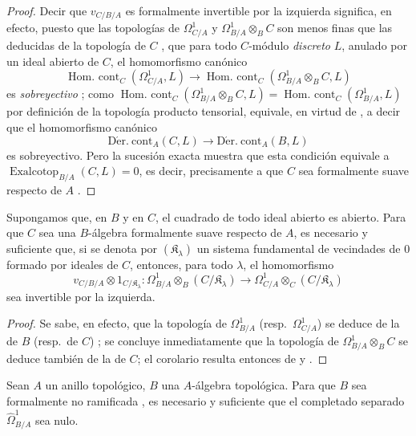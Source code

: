 \begin{proof}
Decir que $v_{C/B/A}$ es formalmente invertible por la izquierda significa, en efecto,
puesto que las topologías de $\Omega^1_{C/A}$ y $\Omega^1_{B/A}\otimes_B C$
son menos finas que las deducidas de la topología de $C$
, que para todo $C$-módulo \emph{discreto} $L$, anulado por un
ideal abierto de $C$, el homomorfismo canónico
\[
  \operatorname{Hom.\ cont}_C(\Omega^1_{C/A},L)\to
  \operatorname{Hom.\ cont}_C(\Omega^1_{B/A}\otimes_B C,L)
\]
es \emph{sobreyectivo} ; como
$\operatorname{Hom.\ cont}_C(\Omega^1_{B/A}\otimes_B C,L)=
\operatorname{Hom.\ cont}_C(\Omega^1_{B/A},L)$ por definición de la topología
producto tensorial, equivale, en virtud de , a decir
que el homomorfismo canónico
\[
  \operatorname{D\acute{e}r.\ cont}_A(C,L)\to
  \operatorname{D\acute{e}r.\ cont}_A(B,L)
\]
es sobreyectivo. Pero la sucesión exacta  muestra que esta
condición equivale a $\operatorname{Exalcotop}_{B/A}(C,L)=0$, es decir,
precisamente a que $C$ sea formalmente suave respecto de $A$
.
\end{proof}

\begin{corollary}[20.7.3]
\label{0.20.7.3-fr}
Supongamos que, en $B$ y en $C$, el cuadrado de todo ideal abierto es abierto.
Para que $C$ sea una $B$-álgebra formalmente suave respecto de $A$, es
necesario y suficiente que, si se denota por $(\mathfrak{K}_\lambda)$ un sistema
fundamental de vecindades de $0$ formado por ideales de $C$, entonces, para todo
$\lambda$, el homomorfismo
\begin{equation}
\tag{20.7.3.1}
\label{0.20.7.3.1-fr}
  v_{C/B/A}\otimes 1_{C/\mathfrak{K}_\lambda}:
  \Omega^1_{B/A}\otimes_B(C/\mathfrak{K}_\lambda)\to
  \Omega^1_{C/A}\otimes_C(C/\mathfrak{K}_\lambda)
\end{equation}
sea invertible por la izquierda.
\end{corollary}

\begin{proof}
Se sabe, en efecto, que la topología de $\Omega^1_{B/A}$ (resp.\
$\Omega^1_{C/A}$) se deduce de la de $B$ (resp.\ de $C$)
; se concluye inmediatamente que la topología de
$\Omega^1_{B/A}\otimes_B C$ se deduce también de la de $C$; el corolario
resulta entonces de \sref{0.20.7.2-fr} y \sref{0.19.1.7-es}.
\end{proof}

\begin{proposition}[20.7.4]
\label{0.20.7.4-fr}
Sean $A$ un anillo topológico, $B$ una $A$-álgebra topológica. Para que
$B$ sea formalmente no ramificada \textup{\sref{0.19.10.2-es}}, es necesario y suficiente
que el completado separado $\widehat{\Omega}^1_{B/A}$ sea nulo.
\end{proposition}

